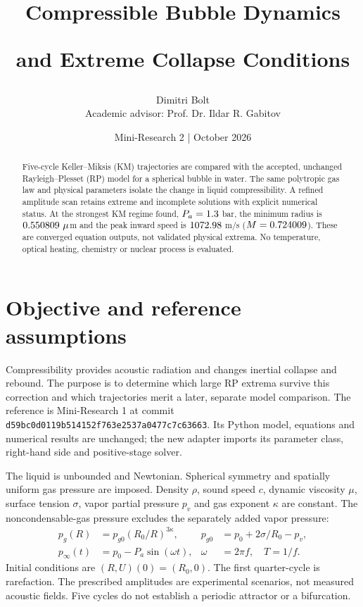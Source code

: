 \documentclass[10pt,a4paper]{article}
\title{\vspace{-13mm}\Large\bfseries Compressible Bubble Dynamics\par and Extreme Collapse Conditions}
\author{Dimitri Bolt\\[2pt]\small Academic advisor: Prof. Dr. Ildar R. Gabitov}
\date{Mini-Research 2 \quad|\quad 31 October 2026}
\begin{document}
\maketitle\vspace{-7mm}
\begin{abstract}
Five-cycle Keller--Miksis (KM) trajectories are compared with the accepted, unchanged Rayleigh--Plesset (RP) model for a spherical bubble in water. The same polytropic gas law and physical parameters isolate the change in liquid compressibility. A refined amplitude scan retains extreme and incomplete solutions with explicit numerical status. At the strongest KM regime found, $P_a=1.3$ bar, the minimum radius is $0.550809\ \mu$m and the peak inward speed is $1072.98$ m/s ($M=0.724009$). These are converged equation outputs, not validated physical extrema. No temperature, optical heating, chemistry or nuclear process is evaluated.
\end{abstract}

\section{Objective and reference assumptions}
Compressibility provides acoustic radiation and changes inertial collapse and rebound. The purpose is to determine which large RP extrema survive this correction and which trajectories merit a later, separate model comparison. The reference is Mini-Research 1 at commit \texttt{d59bc0d0119b514152f763e2537a0477c7c63663}. Its Python model, equations and numerical results are unchanged; the new adapter imports its parameter class, right-hand side and positive-stage solver.

The liquid is unbounded and Newtonian. Spherical symmetry and spatially uniform gas pressure are imposed. Density $\rho$, sound speed $c$, dynamic viscosity $\mu$, surface tension $\sigma$, vapor partial pressure $p_v$ and gas exponent $\kappa$ are constant. The noncondensable-gas pressure excludes the separately added vapor pressure:
\begin{align}
 p_g(R)&=p_{g0}(R_0/R)^{3\kappa},&p_{g0}&=p_0+2\sigma/R_0-p_v,\label{eq:gas}\\
 p_\infty(t)&=p_0-P_a\sin(\omega t),&\omega&=2\pi f,\quad T=1/f.\label{eq:drive}
\end{align}
Initial conditions are $(R,U)(0)=(R_0,0)$. The first quarter-cycle is rarefaction. The prescribed amplitudes are experimental scenarios, not measured acoustic fields. Five cycles do not establish a periodic attractor or a bifurcation.
\end{document}
